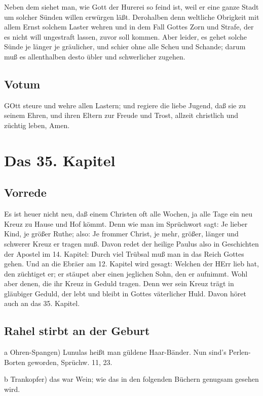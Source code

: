 Neben dem siehet man, wie Gott der Hurerei so feind ist, weil er eine ganze Stadt um solcher Sünden willen erwürgen läßt. Derohalben denn weltliche Obrigkeit mit allem Ernst solchem Laster wehren und in dem Fall Gottes Zorn und Strafe, der es nicht will ungestraft lassen, zuvor soll kommen. Aber leider, es gehet solche Sünde je länger je gräulicher, und schier ohne alle Scheu und Schande; darum muß es allenthalben desto übler und schwerlicher zugehen.

\section{Votum}

GOtt steure und wehre allen Lastern; und regiere die liebe Jugend, daß sie zu seinem Ehren, und ihren Eltern zur Freude und Trost, allzeit christlich und züchtig leben, Amen.

\chapter{Das 35. Kapitel}

\section{Vorrede}

Es ist heuer nicht neu, daß einem Christen oft alle Wochen, ja alle Tage ein neu Kreuz zu Hause und Hof kömmt. Denn wie man im Sprüchwort sagt: Je lieber Kind, je größer Ruthe; also: Je frommer Christ, je mehr, größer, länger und schwerer Kreuz er tragen muß. Davon redet der heilige Paulus also in Geschichten der Apostel im 14. Kapitel: Durch viel Trübsal muß man in das Reich Gottes gehen. Und an die Ebräer am 12. Kapitel wird gesagt: Welchen der HErr lieb hat, den züchtiget er; er stäupet aber einen jeglichen Sohn, den er aufnimmt. Wohl aber denen, die ihr Kreuz in Geduld tragen. Denn wer sein Kreuz trägt in gläubiger Geduld, der lebt und bleibt in Gottes väterlicher Huld. Davon höret auch an das 35. Kapitel.

\section{Rahel stirbt an der Geburt}

a Ohren-Spangen) Lunulas heißt man güldene Haar-Bänder. Nun sind's Perlen-Borten geworden, Sprüchw. 11, 23.

b Trankopfer) das war Wein; wie das in den folgenden Büchern genugsam gesehen wird.

